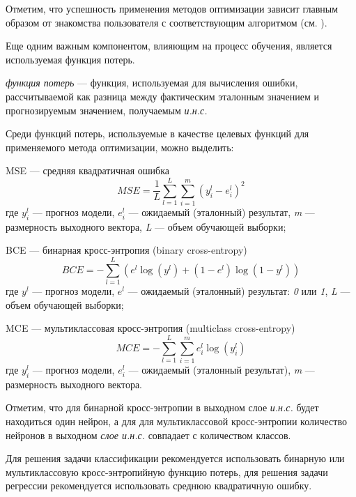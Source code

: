 Отметим, что успешность применения методов оптимизации зависит главным образом от знакомства пользователя с соответствующим алгоритмом (см. ).

Еще одним важным компонентом, влияющим на процесс обучения, является используемая функция потерь.

\textit{функция потерь} --- функция, используемая для вычисления ошибки, рассчитываемой как разница между фактическим эталонным значением и прогнозируемым значением, получаемым \textit{и.н.с.}

Среди функций потерь, используемые в качестве целевых функций для применяемого метода оптимизации, можно выделить:

\begin{textitemize}
	\item MSE --- средняя квадратичная ошибка\\
	\begin{equation*}
		MSE = \frac{1}{L} \sum_{l=1}^L \sum_{i=1}^m (y_i^l - e_i^l)^2
	\end{equation*}
	где $y_i^l$ --- прогноз модели, $e_i^l$ --- ожидаемый (эталонный) результат, \textit{m} --- размерность выходного вектора, \textit{L} --- объем обучающей выборки;

	\item BCE --- бинарная кросс-энтропия (binary cross-entropy)\\
	\begin{equation*}
		BCE = - \sum_{l=1}^L (e^l \log(y^l) + (1 - e^l)\log(1 - y^l))
	\end{equation*}
	где $y^l$ --- прогноз модели, $e^l$ --- ожидаемый (эталонный) результат: \textit{0} или \textit{1}, \textit{L} --- объем обучающей выборки;
	\item MCE --- мультиклассовая кросс-энтропия (multiclass cross-entropy)\\
	\begin{equation*}
		MCE = - \sum_{l=1}^L \sum_{i=1}^m e_{i}^l \log(y_{i}^l)
	\end{equation*}
	где $y_{i}^l$ --- прогноз модели, $e_i^l$ --- ожидаемый (эталонный результат), \textit{m} --- размерность выходного вектора.
\end{textitemize}

Отметим, что для бинарной кросс-энтропии в выходном слое \textit{и.н.с.} будет находиться один нейрон, а для для мультиклассовой кросс-энтропии количество нейронов в выходном \textit{слое и.н.с.} совпадает с количеством классов.

Для решения задачи классификации рекомендуется использовать бинарную или мультиклассовую кросс-энтропийную функцию потерь, для решения задачи регрессии рекомендуется использовать среднюю квадратичную ошибку.

